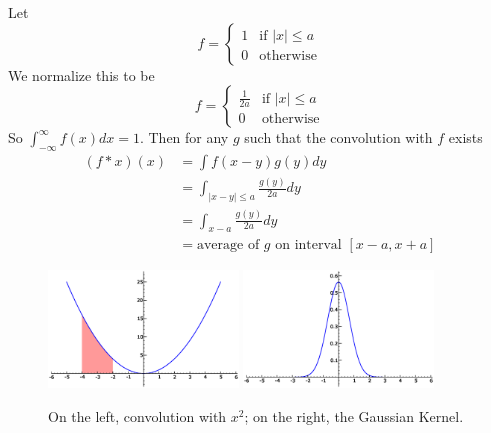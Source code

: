 \begin{ex}
Let
\begin{equation}
f = \begin{cases}1&\text{if }|x|\leq a\\
0&\text{otherwise}\end{cases}
\end{equation}
We normalize this to be
\begin{equation}
f = \begin{cases}\frac{1}{2a}&\text{if }|x|\leq a\\
0&\text{otherwise}\end{cases}
\end{equation}
So $\int^{\infty}_{-\infty}f(x)dx = 1$. Then for any $g$
such that the convolution with $f$ exists
\begin{subequations}
\begin{align}
(f*x)(x) &= \int f(x-y)g(y)dy\\
&= \int_{|x-y|\leq a} \frac{g(y)}{2a}dy\\
&= \int_{x-a} \frac{g(y)}{2a}dy\\
&=\text{average of $g$ on interval $[x-a,x+a]$}
\end{align}
\end{subequations}
\end{ex}


\begin{figure}[h!]
\includegraphics[width=0.45\textwidth]{img/9May2008img1.eps}
\includegraphics[width=0.45\textwidth]{img/9May2008img2.eps}
\caption{On the left, convolution with $x^2$; on the right, the Gaussian Kernel.}\label{img:9May2008:img1}\label{img:9May2008:img2}
\end{figure}


